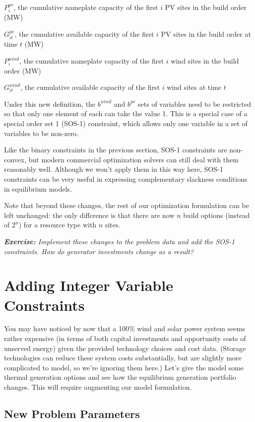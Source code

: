\documentclass[11pt]{article}
\begin{document}
$P^{pv}_i$, the cumulative nameplate capacity of the first $i$ PV sites in the build order (MW)

$G^{pv}_{it}$, the cumulative available capacity of the first $i$ PV sites in the build order at time $t$ (MW)

$P^{wind}_i$, the cumulative nameplate capacity of the first $i$ wind sites in the build order (MW)

$G^{wind}_{it}$, the cumulative available capacity of the first $i$ wind sites at time $t$

Under this new definition, the $b^{wind}$ and $b^{pv}$ sets of variables need to be restricted so that only one element of each can take the value 1. This is a special case of a special order set 1 (SOS-1) constraint, which allows only one variable in a set of variables to be non-zero.

Like the binary constraints in the previous section, SOS-1 constraints are non-convex, but modern commercial optimization solvers can still deal with them reasonably well. Although we won't apply them in this way here, SOS-1 constraints can be very useful in expressing complementary slackness conditions in equilibrium models.

Note that beyond these changes, the rest of our optimization formulation can be left unchanged: the only difference is that there are now $n$ build options (instead of $2^n$) for a resource type with $n$ sites.

\textit{\textbf{Exercise:} Implement these changes to the problem data and add the SOS-1 constraints. How do generator investments change as a result?}

\section{Adding Integer Variable Constraints}

You may have noticed by now that a 100\% wind and solar power system seems rather expensive (in terms of both capital investments and opportunity costs of unserved energy) given the provided technology choices and cost data. (Storage technologies can reduce these system costs substantially, but are slightly more complicated to model, so we're ignoring them here.) Let's give the model some thermal generation options and see how the equilibrium generation portfolio changes. This will require augmenting our model formulation.

\subsection{New Problem Parameters}
\end{document}
